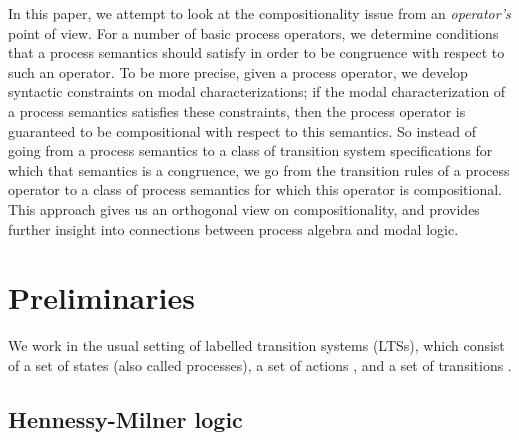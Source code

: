 \documentclass{eptcs}
\begin{document}
In this paper, we attempt to look at the compositionality issue from an \textit{operator's} point of view. For a number of basic process operators, we determine conditions that a process semantics should satisfy in order to be congruence with respect to such an operator. To be more precise, given a process operator, we develop syntactic constraints on modal characterizations; if the modal characterization of a process semantics satisfies these constraints, then the process operator is guaranteed to be compositional with respect to this semantics. So instead of going from a process semantics to a class of transition system specifications for which that semantics is a congruence, we go from the transition rules of a process operator to a class of process semantics for which this operator is compositional. This approach gives us an orthogonal view on compositionality, and provides further insight into connections between process algebra and modal logic.

\section{Preliminaries}

We work in the usual setting of labelled transition systems (LTSs), which consist of a set  of states  (also called processes), a set 
of actions , and a set of transitions .


\subsection{Hennessy-Milner logic}
\label{sec:hml}
\end{document}
